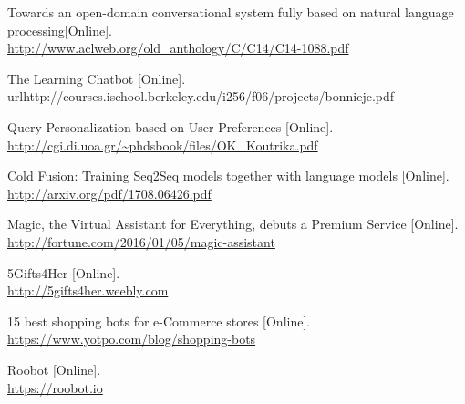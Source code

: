 \begin{thebibliography}{99.}
Towards an open-domain conversational system fully based on natural language processing[Online].  \\
\url{http://www.aclweb.org/old\_anthology/C/C14/C14-1088.pdf}

The Learning Chatbot [Online]. \\
url{http://courses.ischool.berkeley.edu/i256/f06/projects/bonniejc.pdf}

Query Personalization based on User Preferences [Online].  \\
\url{http://cgi.di.uoa.gr/~phdsbook/files/OK\_Koutrika.pdf}

Cold Fusion: Training Seq2Seq models together with language models [Online]. \\
\url{http://arxiv.org/pdf/1708.06426.pdf}

Magic, the Virtual Assistant for Everything, debuts a Premium Service [Online]. \\
\url{http://fortune.com/2016/01/05/magic-assistant}

5Gifts4Her [Online]. \\
\url{http://5gifts4her.weebly.com}

15 best shopping bots for e-Commerce stores [Online]. \\
\url{https://www.yotpo.com/blog/shopping-bots}

Roobot [Online]. \\
\url{https://roobot.io}

\end{thebibliography}
